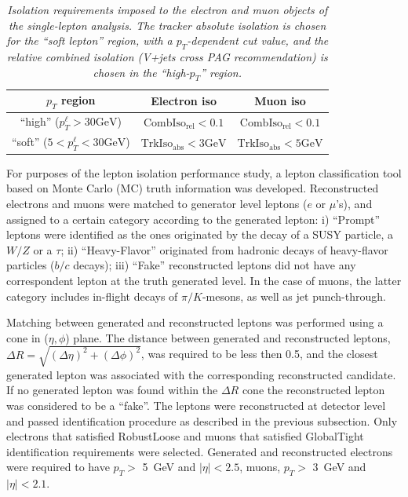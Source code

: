 \begin{table}[h!]
\centering
\begin{tabular}{|c||c|c|}
\hline
$p_{T}$ region & Electron iso & Muon iso \\ \hline
``high'' ($p_{T}^{\ell} > 30 \textrm{GeV}$) & $\textrm{CombIso}_{\textrm{rel}} < 0.1$ & $\textrm{CombIso}_{\textrm{rel}} < 0.1$ \\ \hline
``soft'' ($5 < p_{T}^{\ell} < 30 \textrm{GeV}$) & $\textrm{TrkIso}_{\textrm{abs}} < 3 \textrm{GeV}$ & $\textrm{TrkIso}_{\textrm{abs}} < 5 \textrm{GeV}$ \\ \hline
\end{tabular}
   \caption{\textit{\small{Isolation requirements imposed to the electron and muon objects of the single-lepton analysis. The tracker absolute isolation is chosen for the ``soft lepton'' region, with a $p_{T}$-dependent cut value, and the relative combined isolation (V+jets cross PAG recommendation) is chosen in the ``high-$p_{T}$'' region.}}}
 \label{tab:iso}  
\end{table}

For purposes of the lepton isolation performance study, a lepton classification
tool based on Monte Carlo (MC) truth information was developed. Reconstructed electrons and muons were matched to
generator level leptons ($e$ or $\mu$'s), and assigned to a certain category according to the
generated lepton: i) ``Prompt'' leptons were identified as the ones originated by
the decay of a SUSY particle, a $W/Z$ or a $\tau$; 
ii) ``Heavy-Flavor''  originated from hadronic decays of heavy-flavor 
particles ($b/c$ decays); iii) ``Fake''  reconstructed leptons did not have any correspondent
lepton at the truth generated level. In the case of muons, the latter category
includes in-flight decays of $\pi/K$-mesons, as well as jet punch-through.


Matching between generated and reconstructed leptons was performed using a
cone in ($\eta, \phi$) plane. %
The distance between generated and reconstructed leptons,
$\Delta R = \sqrt{(\Delta \eta)^2 + (\Delta \phi)^2}$, was required to be less then 0.5, and the
closest generated lepton was associated with the corresponding reconstructed candidate. If no
generated lepton was found within the $\Delta R$ cone the reconstructed lepton was considered to be
a ``fake''. The leptons were reconstructed at detector level and passed identification
procedure as described in the previous subsection. Only electrons that satisfied RobustLoose and muons that satisfied
GlobalTight identification requirements were selected. Generated and reconstructed electrons were
required to have $p_{T} >$ 5~GeV and $|\eta| < 2.5$, muons, $p_{T} >$ 3~GeV  and $|\eta| < 2.1$. 

